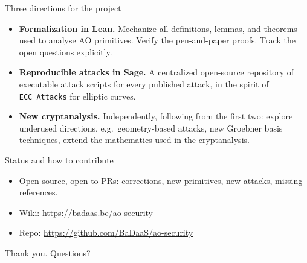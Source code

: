 \documentclass[aspectratio=169]{beamer}
\begin{document}
\begin{frame}{Three directions for the project}
  \begin{itemize}
    \item \textbf{Formalization in Lean.} Mechanize all definitions,
          lemmas, and theorems used to analyse AO primitives.
          Verify the pen-and-paper proofs. Track the open questions
          explicitly.
    \item \textbf{Reproducible attacks in Sage.} A centralized
          open-source repository of executable attack scripts for
          every published attack, in the spirit of \texttt{ECC\_Attacks}
          for elliptic curves.
    \item \textbf{New cryptanalysis.} Independently, following from the first two: explore underused directions,
	    e.g.\ geometry-based attacks, new Groebner basis
	    techniques, extend the mathematics used in the cryptanalysis.
  \end{itemize}
\end{frame}

\begin{frame}{Status and how to contribute}
  \begin{itemize}
    \item Open source, open to PRs: corrections, new primitives,
          new attacks, missing references.
    \item Wiki: \url{https://badaas.be/ao-security}
    \item Repo: \url{https://github.com/BaDaaS/ao-security}
  \end{itemize}
  \vspace{1em}
  \centering
  \large Thank you. Questions?
\end{frame}
\end{document}
